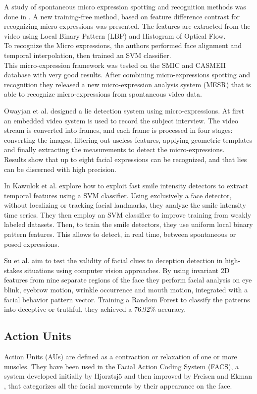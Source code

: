A study of spontaneous micro expression spotting and recognition methods was done in \cite{xli2015reading}. A new training-free method, based on feature difference contrast for recognizing micro-expressions was presented. The features are extracted from the video using Local Binary Pattern (LBP) and Histogram of Optical Flow. \\
To recognize the Micro expressions, the authors performed face alignment and temporal interpolation, then trained an SVM classifier. \\
This micro-expression framework was tested on the SMIC and CASMEII database with very good results. After combining micro-expressions spotting and recognition they released a new micro-expression analysis system (MESR) that is able to recognize micro-expressions from spontaneous video data.

Owayjan et al. \cite{6462897} designed a lie detection system using micro-expressions. At first an embedded video system is used to record the subject interview. The video stream is converted into frames, and each frame is processed in four stages: converting the images, filtering out useless features, applying geometric templates and finally extracting the measurements to detect the micro-expressions. \\
Results show that up to eight facial expressions can be recognized, and that lies can be discerned with high precision.

In \cite{10.1007/978-3-319-47955-2_27} Kawulok et al. explore how to exploit fast smile intensity detectors to extract temporal features using a SVM classifier. Using exclusively a face detector, without localizing or tracking facial landmarks, they analyze the smile intensity time series. They then employ an SVM classifier to improve training from weakly labeled datasets. Then, to train the smile detectors, they use uniform local binary pattern features. This allows to detect, in real time, between spontaneous or posed expressions.

Su et al. \cite{SU201652} aim to test the validity of facial clues to deception detection in high-stakes situations using computer vision approaches. By using invariant 2D features from nine separate regions of the face they perform facial analysis on eye blink, eyebrow motion, wrinkle occurrence and mouth motion, integrated with a facial behavior pattern vector. Training a Random Forest to classify the patterns into deceptive or truthful, they achieved a 76.92\% accuracy.

\subsection{Action Units} \label{au}
Action Units (AUs) are defined as a contraction or relaxation of one or more muscles. They have been used in the Facial Action Coding System (FACS), a system developed initially by Hjorztsjö \cite{facsCH} and then improved by Freisen and Ekman \cite{facs1978}, that categorizes all the facial movements by their appearance on the face.

